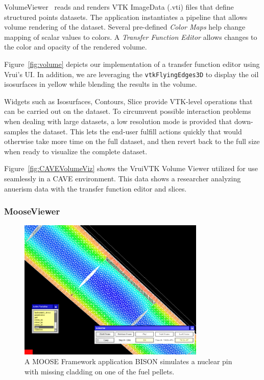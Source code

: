 VolumeViewer~\cite{VolumeViewer} reads and renders VTK ImageData (.vti) files that define structured points datasets.  The application instantiates a pipeline that allows volume rendering of the dataset. Several pre-defined \textit{Color Maps} help change mapping of scalar values to colors. A  \textit{Transfer Function Editor} allows changes to the color and opacity of the rendered volume.

Figure~\ref{fig:volume} depicts our implementation of a transfer function editor using Vrui's UI. In addition, we are leveraging the \texttt{vtkFlyingEdges3D} to display the oil isosurfaces in yellow while blending the results in the volume.

Widgets such as Isosurfaces, Contours, Slice provide VTK-level operations that can be carried out on the dataset. To circumvent possible interaction problems when dealing with large datasets, a low resolution mode is provided that down-samples the dataset. This lets the end-user fulfill actions quickly that would otherwise take more time on the full dataset, and then revert back to the full size when ready to visualize the complete dataset.

Figure~\ref{fig:CAVEVolumeViz} shows the VruiVTK Volume Viewer utilized for use seamlessly in a CAVE environment. This data shows a researcher analyzing anuerism data with the transfer function editor and slices.

\subsubsection{MooseViewer}

\begin{figure}[h!]
 \centering
 \includegraphics[width=3.5in]{images/fuelpin.png}
 \caption{A MOOSE Framework application BISON simulates a nuclear pin with missing cladding on one of the fuel pellets.}
 \label{fig:fuelpin}
\end{figure}

